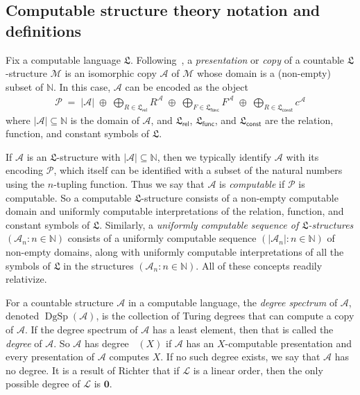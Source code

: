 \documentclass[11pt,a4paper,reqno]{amsart}
\theoremstyle{definition}
\DeclareMathOperator{\degT}{\mathrm{deg}_{\mathrm{T}}}
\DeclareMathOperator{\dgsp}{\mathrm{DgSp}}
\newcommand{\Nb}{\mathbb{N}}
\newcommand{\mc}[1]{\mathcal{#1}}
\newcommand{\mf}[1]{\mathfrak{#1}}
\begin{document}
\subsection*{Computable structure theory notation and definitions}

Fix a computable language $\mf{L}$.  Following~\cites{MontalbanBookWithin,MontalbanBookBeyond}, a \emph{presentation} or \emph{copy} of a countable $\mf{L}$-structure $\mc{M}$ is an isomorphic copy $\mc{A}$ of $\mc{M}$ whose domain is a (non-empty) subset of $\Nb$.  In this case, $\mc{A}$ can be encoded as the object
\begin{align*}
\mc{P} \;=\; |\mc{A}| \;\oplus\; \bigoplus_{R \in \mf{L}_{\mathsf{rel}}} R^{\mc{A}} \;\oplus\; \bigoplus_{F \in \mf{L}_{\mathsf{func}}} F^{\mc{A}} \;\oplus\; \bigoplus_{R \in \mf{L}_{\mathsf{const}}} c^{\mc{A}}
\end{align*}
where $|\mc{A}| \subseteq \Nb$ is the domain of $\mc{A}$, and $\mf{L}_{\mathsf{rel}}$, $\mf{L}_{\mathsf{func}}$, and $\mf{L}_{\mathsf{const}}$ are the relation, function, and constant symbols of $\mf{L}$.

If $\mc{A}$ is an $\mf{L}$-structure with $|\mc{A}| \subseteq \Nb$, then we typically identify $\mc{A}$ with its encoding $\mc{P}$, which itself can be identified with a subset of the natural numbers using the $n$-tupling function. 
Thus we say that $\mc{A}$ is \emph{computable} if $\mc{P}$ is computable.  So a computable $\mf{L}$-structure consists of a non-empty computable domain and uniformly computable interpretations of the relation, function, and constant symbols of $\mf{L}$.  Similarly, a \emph{uniformly computable sequence of $\mf{L}$-structures} $(\mc{A}_n : n \in \Nb)$ consists of a uniformly computable sequence $(|\mc{A}_n| : n \in \Nb)$ of non-empty domains, along with uniformly computable interpretations of all the symbols of $\mf{L}$ in the structures $(\mc{A}_n : n \in \Nb)$. All of these concepts readily relativize.

For a countable structure $\mc{A}$ in a computable language, the \emph{degree spectrum} of $\mc{A}$, denoted $\dgsp(\mc{A})$, is the collection of Turing degrees that can compute a copy of $\mc{A}$.  If the degree spectrum of $\mc{A}$ has a least element, then that is called the \emph{degree} of $\mc{A}$.  So $\mc{A}$ has degree $\degT(X)$ if $\mc{A}$ has an $X$-computable presentation and every presentation of $\mc{A}$ computes $X$. If no such degree exists, we say that $\mc{A}$ has no degree.
It is a result of Richter \cite{Ric81} that if $\mc{L}$ is a linear order, then the only possible degree of $\mc{L}$ is $\mathbf{0}$.
\end{document}
